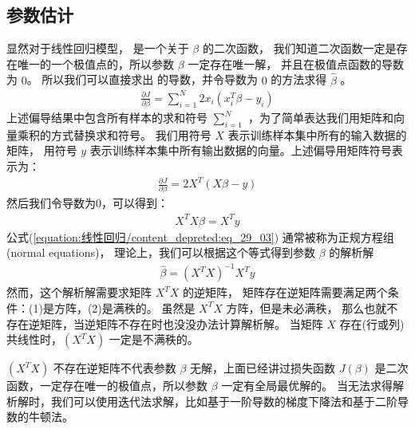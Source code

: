 \documentclass[letterpaper,10pt,english]{sphinxmanual}
\begin{document}
\subsection{参数估计}
\label{\detokenize{_u7ebf_u6027_u56de_u5f52/content:id4}}
显然对于线性回归模型，  是一个关于 \(\beta\) 的二次函数，
我们知道二次函数一定是存在唯一的一个极值点的，所以参数 \(\beta\) 一定存在唯一解，
并且在极值点函数的导数为 \(0\)。
所以我们可以直接求出  的导数，并令导数为 \(0\) 的方法求得 \(\hat{\beta}\) 。
\begin{equation}\label{equation:线性回归/content:线性回归/content:3}
\begin{split}\frac{\partial J}{\partial \beta} = \sum_{i=1}^N 2 x_i (x_i^T \beta - y_i)\end{split}
\end{equation}
上述偏导结果中包含所有样本的求和符号 \(\sum_{i=1}^N\) ，为了简单表达我们用矩阵和向量乘积的方式替换求和符号。
我们用符号 \(X\) 表示训练样本集中所有的输入数据的矩阵，
用符号 \(y\) 表示训练样本集中所有输出数据的向量。上述偏导用矩阵符号表示为：
\begin{equation}\label{equation:线性回归/content:线性回归/content:4}
\begin{split}\frac{\partial J}{\partial \beta} = 2X^T (X \beta - y)\end{split}
\end{equation}
然后我们令导数为0，可以得到：
\begin{equation}\label{equation:线性回归/content:eq_29_03}
\begin{split}X^TX\beta = X^T y\end{split}
\end{equation}
公式(\ref{equation:线性回归/content_depreted:eq_29_03}) 通常被称为正规方程组(normal equations)，
理论上，我们可以根据这个等式得到参数 \(\beta\) 的解析解
\begin{equation}\label{equation:线性回归/content:线性回归/content:5}
\begin{split}\hat{\beta}=(X^TX)^{-1} X^Ty\end{split}
\end{equation}
然而，这个解析解需要求矩阵 \(X^TX\) 的逆矩阵，
矩阵存在逆矩阵需要满足两个条件：(1)是方阵，(2)是满秩的。
虽然是 \(X^TX\) 方阵，但是未必满秩，
那么也就不存在逆矩阵，当逆矩阵不存在时也没没办法计算解析解。
当矩阵 \(X\) 存在(行或列)共线性时，\((X^TX)\) 一定是不满秩的。

\((X^TX)\) 不存在逆矩阵不代表参数 \(\beta\) 无解，上面已经讲过损失函数 \(J(\beta)\)
是二次函数，一定存在唯一的极值点，所以参数 \(\beta\) 一定有全局最优解的。
当无法求得解析解时，我们可以使用迭代法求解，比如基于一阶导数的梯度下降法和基于二阶导数的牛顿法。
\end{document}
